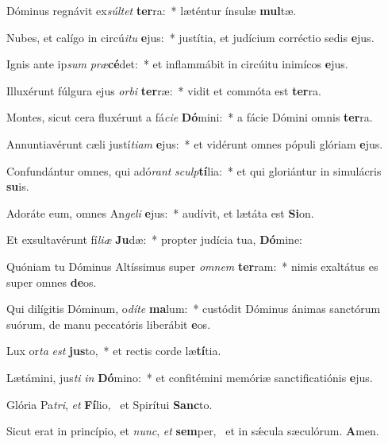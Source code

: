 \item Dóminus regnávit ex\textit{súl}\textit{tet} \textbf{ter}ra:~* læténtur ínsulæ \textbf{mul}tæ.
\item Nubes, et calígo in circú\textit{i}\textit{tu} \textbf{e}jus:~* justítia, et judícium corréctio sedis \textbf{e}jus.
\item Ignis ante ip\textit{sum} \textit{præ}\textbf{cé}det:~* et inflammábit in circúitu inimícos \textbf{e}jus.
\item Illuxérunt fúlgura ejus \textit{or}\textit{bi} \textbf{ter}ræ:~* vidit et commóta est \textbf{ter}ra.
\item Montes, sicut cera fluxérunt a fá\textit{ci}\textit{e} \textbf{Dó}mini:~* a fácie Dómini omnis \textbf{ter}ra.
\item Annuntiavérunt cæli justí\textit{ti}\textit{am} \textbf{e}jus:~* et vidérunt omnes pópuli glóriam \textbf{e}jus.
\item Confundántur omnes, qui adó\textit{rant} \textit{sculp}\textbf{tí}lia:~* et qui gloriántur in simulácris \textbf{su}is.
\item Adoráte eum, omnes An\textit{ge}\textit{li} \textbf{e}jus:~* audívit, et lætáta est \textbf{Si}on.
\item Et exsultavérunt fí\textit{li}\textit{æ} \textbf{Ju}dæ:~* propter judícia tua, \textbf{Dó}mine:
\item Quóniam tu Dóminus Altíssimus super \textit{om}\textit{nem} \textbf{ter}ram:~* nimis exaltátus es super omnes \textbf{de}os.
\item Qui dilígitis Dóminum, o\textit{dí}\textit{te} \textbf{ma}lum:~* custódit Dóminus ánimas sanctórum suórum, de manu peccatóris liberábit \textbf{e}os.
\item Lux or\textit{ta} \textit{est} \textbf{jus}to,~* et rectis corde læ\textbf{tí}tia.
\item Lætámini, jus\textit{ti} \textit{in} \textbf{Dó}mino:~* et confitémini memóriæ sanctificatiónis \textbf{e}jus.
\item Glória Pa\textit{tri}, \textit{et} \textbf{Fí}lio,~\psstar{} et Spirítui \textbf{Sanc}to.
\item Sicut erat in princípio, et \textit{nunc}, \textit{et} \textbf{sem}per,~\psstar{} et in sǽcula sæculórum. \textbf{A}men.